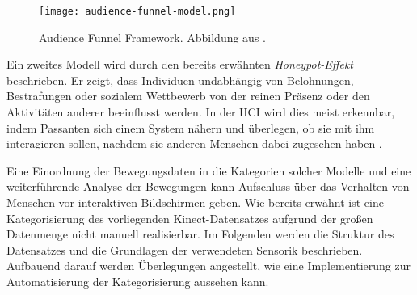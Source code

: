 \begin{figure}[ht]
    \begin{center}
    \texttt{[image: audience-funnel-model.png]}
    \end{center}
    \caption{Audience Funnel Framework. Abbildung aus \citet{mai_audience_2018}.}
    \label{fig:AudienceFunnelModel}
  \end{figure}

Ein zweites Modell wird durch den bereits erwähnten \emph{Honeypot-Effekt} beschrieben.
Er zeigt, dass Individuen undabhängig von Belohnungen, Bestrafungen oder sozialem Wettbewerb
von der reinen Präsenz oder den Aktivitäten anderer beeinflusst werden.
In der \ac{HCI} wird dies meist erkennbar, indem Passanten sich einem System nähern
und überlegen, ob sie mit ihm interagieren sollen,
nachdem sie anderen Menschen dabei zugesehen haben \citep{wouters_uncovering_2016}.

Eine Einordnung der Bewegungsdaten in die Kategorien solcher Modelle
und eine weiterführende Analyse der Bewegungen kann Aufschluss über das Verhalten von Menschen
vor interaktiven Bildschirmen geben.
Wie bereits erwähnt ist eine Kategorisierung des vorliegenden Kinect-Datensatzes
aufgrund der großen Datenmenge nicht manuell realisierbar.
Im Folgenden werden die Struktur des Datensatzes und die Grundlagen der verwendeten Sensorik beschrieben.
Aufbauend darauf werden Überlegungen angestellt,
wie eine Implementierung zur Automatisierung der Kategorisierung aussehen kann.


